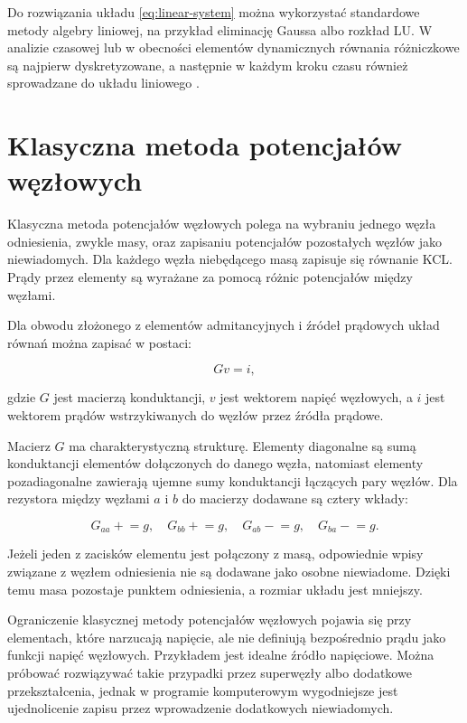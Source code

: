 Do rozwiązania układu \cref{eq:linear-system} można wykorzystać standardowe metody algebry liniowej, na przykład eliminację Gaussa albo rozkład LU. W analizie czasowej lub w obecności elementów dynamicznych równania różniczkowe są najpierw dyskretyzowane, a następnie w każdym kroku czasu również sprowadzane do układu liniowego \cite{quarteroni2007numerical,vlach1994computer}.

\section{Klasyczna metoda potencjałów węzłowych}
\label{sec:klasyczna-mpw}

Klasyczna metoda potencjałów węzłowych polega na wybraniu jednego węzła odniesienia, zwykle masy, oraz zapisaniu potencjałów pozostałych węzłów jako niewiadomych. Dla każdego węzła niebędącego masą zapisuje się równanie KCL. Prądy przez elementy są wyrażane za pomocą różnic potencjałów między węzłami.

Dla obwodu złożonego z elementów admitancyjnych i źródeł prądowych układ równań można zapisać w postaci:

\begin{equation}
\label{eq:nodal-analysis}
Gv = i,
\end{equation}

gdzie \(G\) jest macierzą konduktancji, \(v\) jest wektorem napięć węzłowych, a \(i\) jest wektorem prądów wstrzykiwanych do węzłów przez źródła prądowe.

Macierz \(G\) ma charakterystyczną strukturę. Elementy diagonalne są sumą konduktancji elementów dołączonych do danego węzła, natomiast elementy pozadiagonalne zawierają ujemne sumy konduktancji łączących pary węzłów. Dla rezystora między węzłami \(a\) i \(b\) do macierzy dodawane są cztery wkłady:

\begin{equation}
\label{eq:resistor-stamp}
G_{aa} \mathrel{+}= g,\quad
G_{bb} \mathrel{+}= g,\quad
G_{ab} \mathrel{-}= g,\quad
G_{ba} \mathrel{-}= g.
\end{equation}

Jeżeli jeden z zacisków elementu jest połączony z masą, odpowiednie wpisy związane z węzłem odniesienia nie są dodawane jako osobne niewiadome. Dzięki temu masa pozostaje punktem odniesienia, a rozmiar układu jest mniejszy.

Ograniczenie klasycznej metody potencjałów węzłowych pojawia się przy elementach, które narzucają napięcie, ale nie definiują bezpośrednio prądu jako funkcji napięć węzłowych. Przykładem jest idealne źródło napięciowe. Można próbować rozwiązywać takie przypadki przez superwęzły albo dodatkowe przekształcenia, jednak w programie komputerowym wygodniejsze jest ujednolicenie zapisu przez wprowadzenie dodatkowych niewiadomych.

